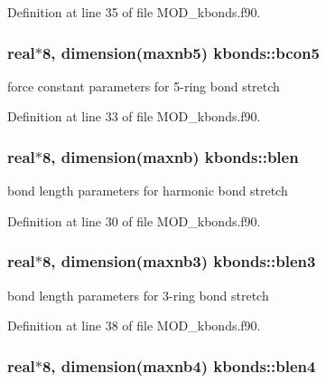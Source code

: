 Definition at line 35 of file M\-O\-D\-\_\-kbonds.\-f90.

\hypertarget{classkbonds_af68f430fbe6e2899f8fbf5ed22a89b3d}{
\subsubsection[{bcon5}]{\setlength{\rightskip}{0pt plus 5cm}real$\ast$8, dimension({\bf maxnb5}) kbonds\-::bcon5}}\label{classkbonds_af68f430fbe6e2899f8fbf5ed22a89b3d}


force constant parameters for 5-\/ring bond stretch 



Definition at line 33 of file M\-O\-D\-\_\-kbonds.\-f90.

\hypertarget{classkbonds_af87c02461c2ee0ac0f82aeefa447ee38}{
\subsubsection[{blen}]{\setlength{\rightskip}{0pt plus 5cm}real$\ast$8, dimension({\bf maxnb}) kbonds\-::blen}}\label{classkbonds_af87c02461c2ee0ac0f82aeefa447ee38}


bond length parameters for harmonic bond stretch 



Definition at line 30 of file M\-O\-D\-\_\-kbonds.\-f90.

\hypertarget{classkbonds_ae67999ffcbf08c7bbf51e16fe88f9a35}{
\subsubsection[{blen3}]{\setlength{\rightskip}{0pt plus 5cm}real$\ast$8, dimension({\bf maxnb3}) kbonds\-::blen3}}\label{classkbonds_ae67999ffcbf08c7bbf51e16fe88f9a35}


bond length parameters for 3-\/ring bond stretch 



Definition at line 38 of file M\-O\-D\-\_\-kbonds.\-f90.

\hypertarget{classkbonds_ad18f49c893ecbd07b6ceaf640eb8bb5c}{
\subsubsection[{blen4}]{\setlength{\rightskip}{0pt plus 5cm}real$\ast$8, dimension({\bf maxnb4}) kbonds\-::blen4}}\label{classkbonds_ad18f49c893ecbd07b6ceaf640eb8bb5c}


